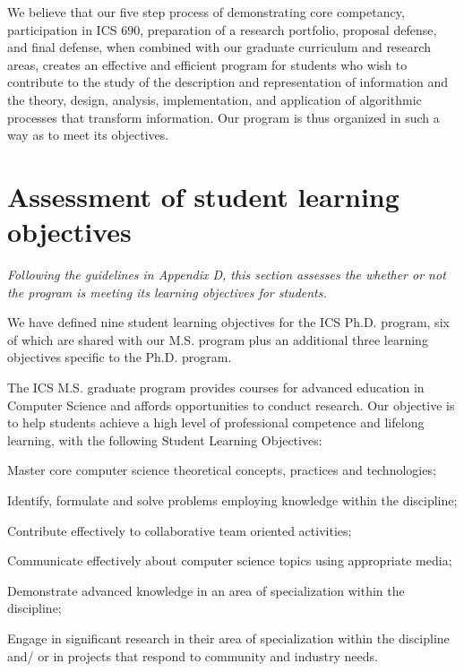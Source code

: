 \documentclass[12pt]{article}
\begin{document}
We believe that our five step process of demonstrating core competancy,
participation in ICS 690, preparation of a research portfolio, proposal
defense, and final defense, when combined with our graduate curriculum and
research areas, creates an effective and efficient program for students who
wish to contribute to the study of the description and representation of
information and the theory, design, analysis, implementation, and
application of algorithmic processes that transform information. Our
program is thus organized in such a way as to meet its objectives.


\section{Assessment of student learning objectives}

{\em Following the guidelines in Appendix D, this section assesses the
  whether or not the program is meeting its learning objectives for
  students. }

We have defined nine student learning objectives for the ICS Ph.D. program,
six of which are shared with our M.S. program plus an additional three
learning objectives specific to the Ph.D. program.

The ICS M.S. graduate program provides courses for advanced education in
Computer Science and affords opportunities to conduct research. Our
objective is to help students achieve a high level of professional
competence and lifelong learning, with the following Student Learning
Objectives:

\begin{list}{.}{}
\item Master core computer science theoretical concepts, practices and technologies;
\item Identify, formulate and solve problems employing knowledge within the discipline;
\item Contribute effectively to collaborative team oriented activities;
\item Communicate effectively about computer science topics using appropriate media;
\item Demonstrate advanced knowledge in an area of specialization within the discipline;
\item Engage in signiﬁcant research in their area of specialization within the discipline and/
or in projects that respond to community and industry needs.
\end{list}
\end{document}
